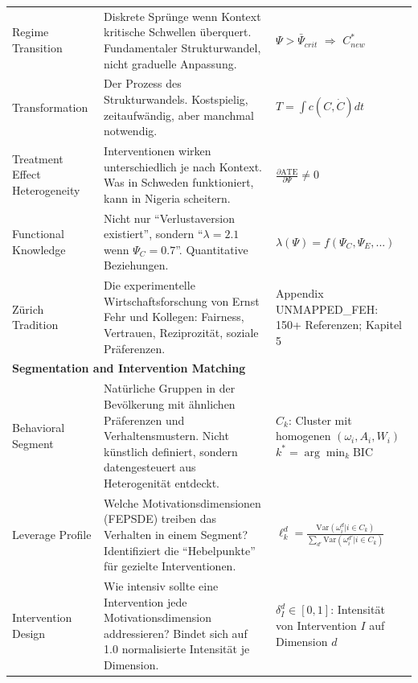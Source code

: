 \begin{center}
\begin{longtable}{@{}p{2.5cm}p{5.2cm}p{5.2cm}@{}}
Regime Transition &
Diskrete Sprünge wenn Kontext kritische Schwellen überquert. Fundamentaler Strukturwandel, nicht graduelle Anpassung. &
$\Psi > \bar{\Psi}_{crit}$ $\Rightarrow$ $C^*_{new}$ \\

Transformation &
Der Prozess des Strukturwandels. Kostspielig, zeitaufwändig, aber manchmal notwendig. &
$T = \int c(C, \dot{C}) dt$ \\

Treatment Effect Heterogeneity &
Interventionen wirken unterschiedlich je nach Kontext. Was in Schweden funktioniert, kann in Nigeria scheitern. &
$\frac{\partial \text{ATE}}{\partial \Psi} \neq 0$ \\

Functional Knowledge &
Nicht nur ``Verlustaversion existiert'', sondern ``$\lambda = 2.1$ wenn $\Psi_C = 0.7$''. Quantitative Beziehungen. &
$\lambda(\Psi) = f(\Psi_C, \Psi_E, ...)$ \\

Zürich Tradition &
Die experimentelle Wirtschaftsforschung von Ernst Fehr und Kollegen: Fairness, Vertrauen, Reziprozität, soziale Präferenzen. &
Appendix UNMAPPED_FEH: 150+ Referenzen; \newline Kapitel 5 \\

\midrule
\multicolumn{3}{l}{\cellcolor{orange!10}\textbf{Segmentation and Intervention Matching}} \\
\midrule

Behavioral Segment &
Natürliche Gruppen in der Bevölkerung mit ähnlichen Präferenzen und Verhaltensmustern. Nicht künstlich definiert, sondern datengesteuert aus Heterogenität entdeckt. &
$C_k$: Cluster mit homogenen $(\omega_i, A_i, W_i)$ \newline $k^* = \arg\min_k \text{BIC}$ \\

Leverage Profile &
Welche Motivationsdimensionen (FEPSDE) treiben das Verhalten in einem Segment? Identifiziert die ``Hebelpunkte'' für gezielte Interventionen. &
$\ell_k^d = \frac{\text{Var}(\omega_i^d | i \in C_k)}{\sum_{d'} \text{Var}(\omega_i^{d'} | i \in C_k)}$ \\

Intervention Design &
Wie intensiv sollte eine Intervention jede Motivationsdimension addressieren? Bindet sich auf 1.0 normalisierte Intensität je Dimension. &
$\delta_I^d \in [0,1]$: Intensität von Intervention $I$ auf Dimension $d$ \\


\end{longtable}
\end{center}
